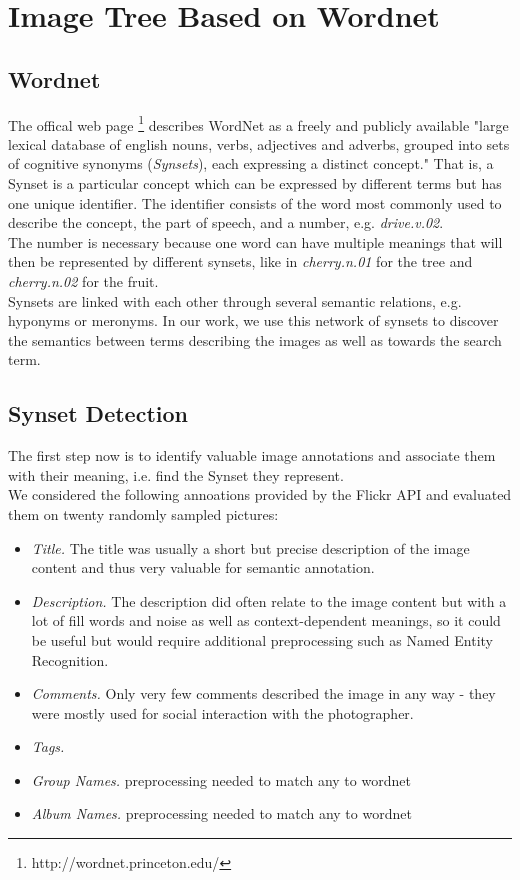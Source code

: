 %
\section{Image Tree Based on Wordnet}
\label{sec_wordnetsearchtree}

\subsection{Wordnet}
The offical web page \footnote{http://wordnet.princeton.edu/} describes WordNet as a freely and publicly available "large lexical database of english nouns, verbs, adjectives and adverbs, grouped into sets of cognitive synonyms (\emph{Synsets}), each expressing a distinct concept." That is, a Synset is a particular concept which can be expressed by different terms but has one unique identifier. The identifier consists of the word most commonly used to describe the concept, the part of speech, and a number, e.g. \emph{drive.v.02}.\\
The number is necessary because one word can have multiple meanings that will then be represented by different synsets, like in \emph{cherry.n.01} for the tree and \emph{cherry.n.02} for the fruit. \\

Synsets are linked with each other through several semantic relations, e.g. hyponyms or meronyms.
In our work, we use this network of synsets to discover the semantics between terms describing the images as well as towards the search term. \\
  
  
\subsection{Synset Detection}
The first step now is to identify valuable image annotations and associate them with their meaning, i.e. find the Synset they represent. \\
We considered the following annoations provided by the Flickr API and evaluated them on twenty randomly sampled pictures: 
\begin{itemize} 
\item{\emph{Title.}} The title was usually a short but precise description of the image content and thus very valuable for semantic annotation.
\item{\emph{Description.}} The description did often relate to the image content but with a lot of fill words and noise as well as context-dependent meanings, so it could be useful but would require additional preprocessing such as Named Entity Recognition.
\item{\emph{Comments.}} Only very few comments described the image in any way - they were mostly used for social interaction with the photographer. 
\item{\emph{Tags.}} 
\item{\emph{Group Names.}}  preprocessing needed to match any to wordnet
\item{\emph{Album Names.}}  preprocessing needed to match any to wordnet
\end{itemize}

